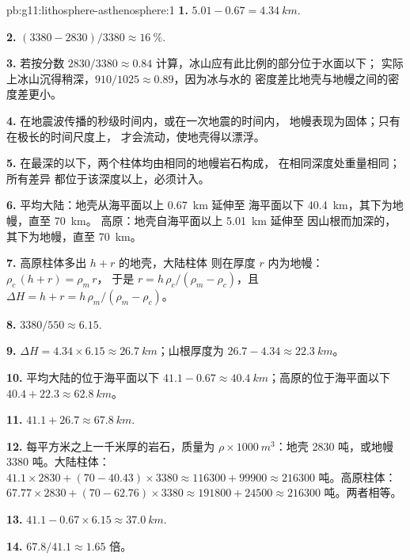 \begin{solution}{pb:g11:lithosphere-asthenosphere:1}
\textbf{1.} $5.01 - 0.67 = \qty{4.34}{km}$.

\textbf{2.} $(3380 - 2830)/3380 \approx \qty{16}{\percent}$.

\textbf{3.} 若按分数 $2830/3380 \approx 0.84$ 计算，冰山应有此比例的部分位于水面以下；
实际上冰山沉得稍深，$910/1025 \approx 0.89$，因为冰与水的
密度差比地壳与地幔之间的密度差更小。

\textbf{4.} 在地震波传播的秒级时间内，或在一次地震的时间内，
地幔表现为固体；只有在极长的时间尺度上，
才会流动，使地壳得以漂浮。

\textbf{5.} 在最深的以下，两个柱体均由相同的地幔岩石构成，
在相同深度处重量相同；所有差异
都位于该深度以上，必须计入。

\textbf{6.} 平均大陆：地壳从海平面以上 \qty{0.67}{km} 延伸至
海平面以下 \qty{40.4}{km}，其下为地幔，直至 \qty{70}{km}。
高原：地壳自海平面以上 \qty{5.01}{km} 延伸至
因山根而加深的，其下为地幔，直至 \qty{70}{km}。

\textbf{7.} 高原柱体多出 $h + r$ 的地壳，大陆柱体
则在厚度 $r$ 内为地幔：$\rho_c\,(h + r) = \rho_m\,r$，
于是 $r = h\,\rho_c/(\rho_m - \rho_c)$，且 $\Delta H = h + r =
h\,\rho_m/(\rho_m - \rho_c)$。

\textbf{8.} $3380/550 \approx 6.15$.

\textbf{9.} $\Delta H = 4.34 \times 6.15 \approx \qty{26.7}{km}$；山根厚度为
$26.7 - 4.34 \approx \qty{22.3}{km}$。

\textbf{10.} 平均大陆的位于海平面以下 $41.1 - 0.67 \approx
\qty{40.4}{km}$；高原的位于海平面以下 $40.4 + 22.3 \approx
\qty{62.8}{km}$。

\textbf{11.} $41.1 + 26.7 \approx \qty{67.8}{km}$.

\textbf{12.} 每平方米之上一千米厚的岩石，质量为
$\rho \times \qty{1000}{m^3}$：地壳 \num{2830} 吨，或地幔 \num{3380}
吨。大陆柱体：$41.1 \times 2830 + (70 - 40.43) \times 3380
\approx \num{116300} + \num{99900} \approx \num{216300}$ 吨。高原柱体：
$67.77 \times 2830 + (70 - 62.76) \times 3380 \approx \num{191800} +
\num{24500} \approx \num{216300}$ 吨。两者相等。

\textbf{13.} $41.1 - 0.67 \times 6.15 \approx \qty{37.0}{km}$.

\textbf{14.} $67.8/41.1 \approx 1.65$ 倍。


\end{solution}
